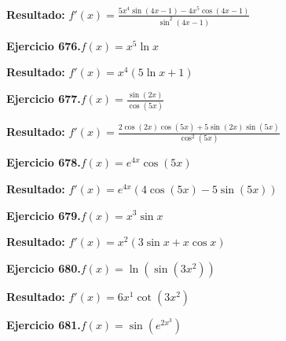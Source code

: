 \documentclass[10pt,a4paper]{article}
\begin{document}
\begin{solbox}
\textbf{Resultado:} \(\displaystyle f'(x) = \frac{5x^{4}\sin(4x -1) - 4x^{5}\cos(4x -1)}{\sin^2(4x -1)}\)
\end{solbox}

\newpage
\begin{ejbox}
\textbf{Ejercicio 676.}\quad $f(x) = x^{5} \ln x$
\end{ejbox}

\begin{solbox}
\textbf{Resultado:} \(\displaystyle f'(x) = x^{4}(5\ln x + 1)\)
\end{solbox}

\begin{ejbox}
\textbf{Ejercicio 677.}\quad $f(x) = \frac{\sin(2x)}{\cos(5x)}$
\end{ejbox}

\begin{solbox}
\textbf{Resultado:} \(\displaystyle f'(x) = \frac{2\cos(2x)\cos(5x) + 5\sin(2x)\sin(5x)}{\cos^2(5x)}\)
\end{solbox}

\begin{ejbox}
\textbf{Ejercicio 678.}\quad $f(x) = e^{4x} \cos(5x)$
\end{ejbox}

\begin{solbox}
\textbf{Resultado:} \(\displaystyle f'(x) = e^{4x}(4\cos(5x) - 5\sin(5x))\)
\end{solbox}

\newpage
\begin{ejbox}
\textbf{Ejercicio 679.}\quad $f(x) = x^{3} \sin x$
\end{ejbox}

\begin{solbox}
\textbf{Resultado:} \(\displaystyle f'(x) = x^{2}(3\sin x + x\cos x)\)
\end{solbox}

\begin{ejbox}
\textbf{Ejercicio 680.}\quad $f(x) = \ln(\sin(3x^{2}))$
\end{ejbox}

\begin{solbox}
\textbf{Resultado:} \(\displaystyle f'(x) = 6x^{1}\cot(3x^{2})\)
\end{solbox}

\begin{ejbox}
\textbf{Ejercicio 681.}\quad $f(x) = \sin(e^{2x^{3}})$
\end{ejbox}
\end{document}
